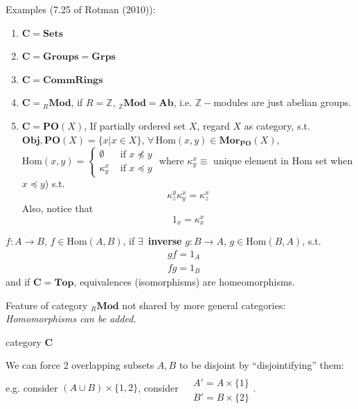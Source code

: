 Examples (7.25 of Rotman (2010)\cite{agat:JRotman2010}): 
\begin{enumerate}
\item[(i)] $\mathbf{C} = \mathbf{\text{Sets}}$  
\item[(ii)] $\mathbf{C} = \mathbf{\text{Groups}} = \mathbf{\text{Grps}}$ 
\item[(iii)]  $\mathbf{C} = \mathbf{\text{CommRings}}$
\item[(iv)]  $\mathbf{C} = {}_R\textbf{Mod}$, if $R=\mathbb{Z}$, ${}_{\mathbb{Z}}\textbf{Mod} = \textbf{Ab}$, i.e. $\mathbb{Z}-$modules are just abelian groups.   
\item[(v)] $\mathbf{C} =\textbf{PO}(X)$, If partially ordered set $X$, regard $X$ as category, s.t. $\textbf{Obj}, \textbf{PO}(X) = \lbrace x | x\in X\rbrace$, $\forall \, \text{Hom}(x,y) \in \textbf{Mor}_{\textbf{PO}}(X)$, $\text{Hom}(x,y) = \begin{cases} \emptyset & \text{ if } x \npreceq y \\  \kappa_y^x & \text{ if } x \preceq y   \end{cases}$ where $\kappa_y^x \equiv $ unique element in $\text{Hom}$ set when $x \preceq y$) s.t. 
\[
\kappa_z^y \kappa_y^x  =\kappa_z^x
\]
Also, notice that 
\[
1_x = \kappa_x^x
\]
\end{enumerate}

\begin{definition}
$f:A\to B$, $f\in \text{Hom}(A,B)$, if $\exists \, $ \textbf{inverse} $g:B\to A$, $g\in \text{Hom}(B,A)$, s.t. 
\[
\begin{aligned}
& gf = 1_A \\ 
& fg = 1_B
\end{aligned}
\]
and if $\mathbf{C} = \textbf{Top}$, equivalences (isomorphisms) are homeomorphisms.  
\end{definition}

Feature of category ${}_R\textbf{Mod}$ not shared by more general categories: \emph{Homomorphisms can be added.}

\begin{definition}
category $\mathbf{C}$
\end{definition}  








We can force 2 overlapping subsets $A,B$ to be disjoint by ``disjointifying'' them: e.g. consider $(A\cup B) \times \lbrace 1,2 \rbrace$, consider $\begin{aligned} & \quad \\
& A' = A\times \lbrace 1 \rbrace \\
& B' = B\times \lbrace 2 \rbrace \end{aligned}$.

